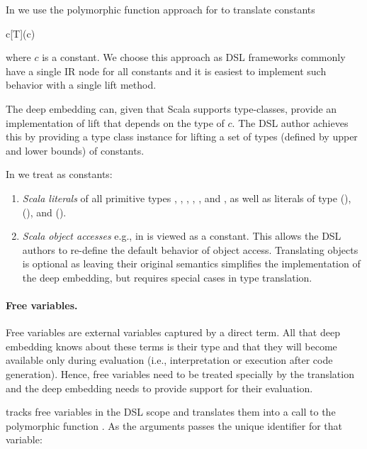   In \yy we use the polymorphic function approach for to translate constants

      \infyy{}
          {}
          {c}{[T](c)}

  where $c$ is a constant. We choose this approach as DSL frameworks
  commonly have a single IR node for all constants and it is easiest to implement
  such behavior with a single lift method.

  The deep embedding can, given that Scala supports type-classes, provide an implementation
  of lift that depends on the type of $c$. The DSL author achieves this
  by providing a type class instance for lifting a set of types (defined by upper and lower bounds)
  of constants.

  In \yy we treat as constants:
  \begin{enumerate}

   \item \emph{Scala literals} of all primitive types , ,
     , , , and , as well as literals of
      type  (),  (\code{()}), and  ().

   \item \emph{Scala object accesses} e.g.,  in  is viewed as a constant. This allows
    the DSL authors to re-define the default behavior of object access. Translating objects is optional as
    leaving their original semantics simplifies the implementation of the deep embedding,
    but requires special cases in type translation.
  \end{enumerate}


\paragraph{Free variables.} Free variables are external variables captured by
  a direct \edsl{} term.  All that deep embedding knows about these terms is
  their type and that they will become available only during evaluation (i.e., interpretation or
  execution after code generation).  Hence, free variables need to be treated
  specially by the translation and the deep embedding needs to provide support
  for their evaluation.

  \yy tracks free variables in the DSL scope and translates them into a call to the polymorphic function . As the arguments
  \yy passes the unique identifier for that variable:

